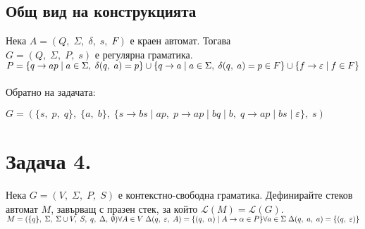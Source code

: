 \documentclass[12pt]{article}
\newcommand{\Lang}{\mathcal{L}}
\begin{document}

\subsection{Общ вид на конструкцията}

Нека $A = (Q, \; \Sigma, \; \delta, \; s, \; F)$ е краен автомат. Тогава \\

$G = (Q, \; \Sigma, \; P, \; s)$ е регулярна граматика. \\

$P = \{q \to ap \; | \; a \in \Sigma, \; \delta(q, \; a) = p\} \cup \{q \to a \; | \; a \in \Sigma, \; \delta(q, \; a) = p \in F\} \cup \\
\{f \to \varepsilon \; | \; f \in F\} $ \\\\

Обратно на задачата:

$G = (\{s, \; p, \; q\}, \; \{a, \; b\}, \; \{s \to bs \; | \; ap, \; p \to ap \; | \; bq \; | \; b, \; q \to ap \; | \;  bs \; | \; \varepsilon \}, \; s)$ 

\section{Задача 4.}

Нека $G = (V, \; \Sigma, \; P, \; S)$ е контекстно-свободна граматика.
Дефинирайте стеков автомат $M$, завърващ с празен стек, за който $\Lang(M) = \Lang(G)$. \\

$M = (\{q\}, \; \Sigma, \; \Sigma \cup V, \; S, \; q, \; \Delta, \; \emptyset) \\\\
\forall A \in V \; \Delta(q, \; \varepsilon, \; A) = \{(q, \; \alpha) \; | \; A \to \alpha \in P\} \\\\
\forall a \in \Sigma \; \Delta(q, \; a, \; a) = \{(q, \; \varepsilon)\}$
\end{document}

